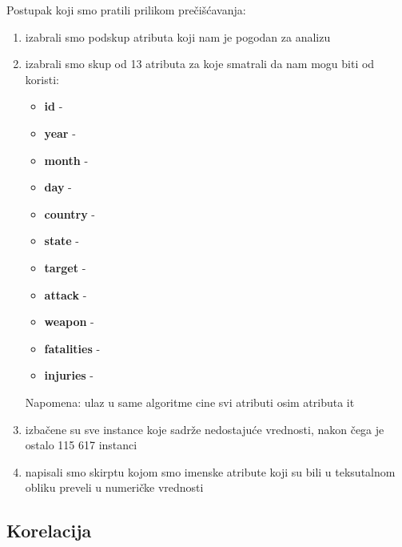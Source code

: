 \documentclass[a4paper]{article}
\begin{document}
Postupak koji smo pratili prilikom prečišćavanja:
\begin{enumerate}
	\item izabrali smo podskup atributa koji nam je pogodan za analizu 
	\item izabrali smo skup od 13 atributa za koje smatrali da nam mogu biti od koristi: 
	\begin{itemize}
		\item \textbf{id} -
		\item \textbf{year} -
		\item \textbf{month} -
		\item \textbf{day} -
		\item \textbf{country} -
		\item \textbf{state} -
		\item \textbf{target} -
		\item \textbf{attack} -
		\item \textbf{weapon} -
		\item \textbf{fatalities} -
		\item \textbf{injuries} -\\
	\end{itemize}
	Napomena: ulaz u same algoritme cine svi atributi osim atributa it 
\item izbačene su sve instance koje sadrže nedostajuće vrednosti, nakon čega je ostalo 115 617 instanci
\item napisali smo skirptu kojom smo imenske atribute koji su bili u teksutalnom obliku preveli u numeričke vrednosti 

\end{enumerate}


\subsection{Korelacija}
  
\end{document}
